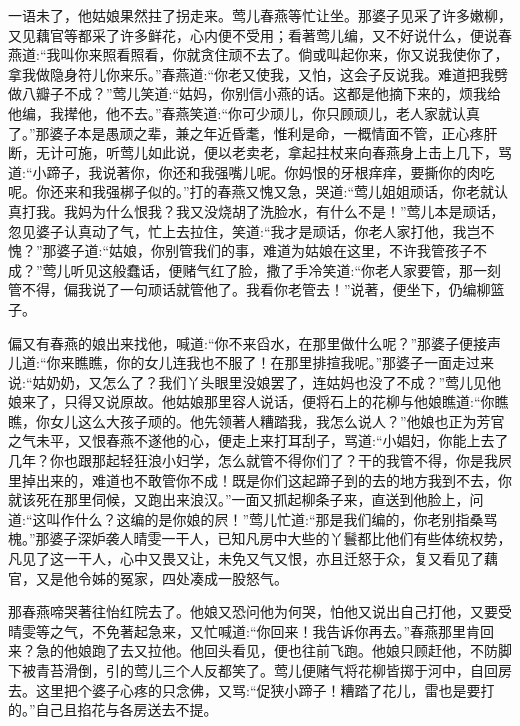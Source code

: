 \begin{parag}
    一语未了，他姑娘果然拄了拐走来。莺儿春燕等忙让坐。那婆子见采了许多嫩柳，又见藕官等都采了许多鲜花，心内便不受用；看著莺儿编，又不好说什么，便说春燕道:“我叫你来照看照看，你就贪住顽不去了。倘或叫起你来，你又说我使你了，拿我做隐身符儿你来乐。”春燕道:“你老又使我，又怕，这会子反说我。难道把我劈做八瓣子不成？”莺儿笑道:“姑妈，你别信小燕的话。这都是他摘下来的，烦我给他编，我撵他，他不去。”春燕笑道:“你可少顽儿，你只顾顽儿，老人家就认真了。”那婆子本是愚顽之辈，兼之年近昏耄，惟利是命，一概情面不管，正心疼肝断，无计可施，听莺儿如此说，便以老卖老，拿起拄杖来向春燕身上击上几下，骂道:“小蹄子，我说著你，你还和我强嘴儿呢。你妈恨的牙根痒痒，要撕你的肉吃呢。你还来和我强梆子似的。”打的春燕又愧又急，哭道:“莺儿姐姐顽话，你老就认真打我。我妈为什么恨我？我又没烧胡了洗脸水，有什么不是！”莺儿本是顽话，忽见婆子认真动了气，忙上去拉住，笑道:“我才是顽话，你老人家打他，我岂不愧？”那婆子道:“姑娘，你别管我们的事，难道为姑娘在这里，不许我管孩子不成？”莺儿听见这般蠢话，便赌气红了脸，撒了手冷笑道:“你老人家要管，那一刻管不得，偏我说了一句顽话就管他了。我看你老管去！”说著，便坐下，仍编柳篮子。
\end{parag}


\begin{parag}
    偏又有春燕的娘出来找他，喊道:“你不来舀水，在那里做什么呢？”那婆子便接声儿道:“你来瞧瞧，你的女儿连我也不服了！在那里排揎我呢。”那婆子一面走过来说:“姑奶奶，又怎么了？我们丫头眼里没娘罢了，连姑妈也没了不成？”莺儿见他娘来了，只得又说原故。他姑娘那里容人说话，便将石上的花柳与他娘瞧道:“你瞧瞧，你女儿这么大孩子顽的。他先领著人糟踏我，我怎么说人？”他娘也正为芳官之气未平，又恨春燕不遂他的心，便走上来打耳刮子，骂道:“小娼妇，你能上去了几年？你也跟那起轻狂浪小妇学，怎么就管不得你们了？干的我管不得，你是我屄里掉出来的，难道也不敢管你不成！既是你们这起蹄子到的去的地方我到不去，你就该死在那里伺候，又跑出来浪汉。”一面又抓起柳条子来，直送到他脸上，问道:“这叫作什么？这编的是你娘的屄！”莺儿忙道:“那是我们编的，你老别指桑骂槐。”那婆子深妒袭人晴雯一干人，已知凡房中大些的丫鬟都比他们有些体统权势，凡见了这一干人，心中又畏又让，未免又气又恨，亦且迁怒于众，复又看见了藕官，又是他令姊的冤家，四处凑成一股怒气。
\end{parag}


\begin{parag}
    那春燕啼哭著往怡红院去了。他娘又恐问他为何哭，怕他又说出自己打他，又要受晴雯等之气，不免著起急来，又忙喊道:“你回来！我告诉你再去。”春燕那里肯回来？急的他娘跑了去又拉他。他回头看见，便也往前飞跑。他娘只顾赶他，不防脚下被青苔滑倒，引的莺儿三个人反都笑了。莺儿便赌气将花柳皆掷于河中，自回房去。这里把个婆子心疼的只念佛，又骂:“促狭小蹄子！糟踏了花儿，雷也是要打的。”自己且掐花与各房送去不提。
\end{parag}


